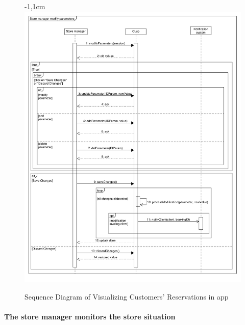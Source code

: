 \documentclass{article}
\begin{document}
\begin{center}
							\begin{figure}[!h]
								\begin{adjustwidth} {-1,1cm}{}
									\centering
									\includegraphics[scale=0.385]{SD/7_modifyParameters.pdf}\\
									\caption{Sequence Diagram of Visualizing Customers' Reservations in app}
								\end{adjustwidth}
							\end{figure}

				\end{center}



\newpage
			
			\paragraph{The store manager monitors the store situation}
			
\end{document}
